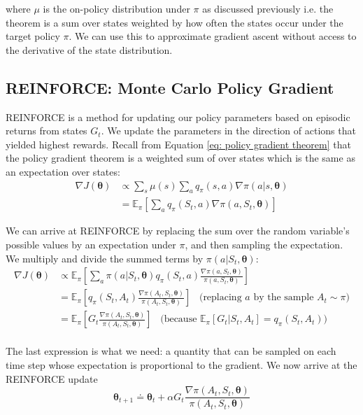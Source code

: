 where $\mu$ is the on-policy distribution under $\pi$ as discussed previously i.e. the theorem is a sum over states weighted by how often the states occur under the target policy $\pi$. We can use this to approximate gradient ascent without access to the derivative of the state distribution.

\subsection{REINFORCE: Monte Carlo Policy Gradient}
REINFORCE is a method for updating our policy parameters based on episodic returns from states $G_t$. We update the parameters in the direction of actions that yielded highest rewards. Recall from Equation \ref{eq: policy gradient theorem} that the policy gradient theorem is a weighted sum of over states which is the same as an expectation over states:
\begin{align}
\nabla J(\boldsymbol{\theta}) &\propto \sum_{s} \mu(s) \sum_{a} q_\pi(s,a) \nabla \pi(a|s, \boldsymbol{\theta}) \\
&= \mathbb{E}_\pi \left[\sum_{a} q_\pi(S_t, a) \nabla \pi(a, S_t, \boldsymbol{\theta})  \right]
\end{align}

We can arrive at REINFORCE by replacing the sum over the random variable's possible values by an expectation under $\pi$, and then sampling the expectation. We multiply and divide the summed terms by $\pi(a | S_t, \boldsymbol{\theta})$:
\begin{align}
\nabla J(\boldsymbol{\theta}) &\propto \mathbb{E}_\pi \left[\sum_{a} \pi(a | S_t, \boldsymbol{\theta}) q_\pi(S_t, a) \frac{\nabla \pi(a, S_t, \boldsymbol{\theta})}{\pi(a, S_t, \boldsymbol{\theta})} \right] \\
&= \mathbb{E}_\pi \left[q_\pi(S_t, A_t) \frac{\nabla \pi(A_t, S_t, \boldsymbol{\theta})}{\pi(A_t, S_t, \boldsymbol{\theta})} \right] \; \; \; \text{(replacing $a$ by the sample $A_t \sim \pi$)} \\
&= \mathbb{E}_\pi \left[G_t \frac{\nabla \pi(A_t, S_t, \boldsymbol{\theta})}{\pi(A_t, S_t, \boldsymbol{\theta})} \right] \; \; \; \text{(because $\mathbb{E}_\pi \left[G_t|S_t, A_t\right] = q_\pi(S_t, A_t)$)} \\
\end{align}

The last expression is what we need: a quantity that can be sampled on each time step whose expectation is proportional to the gradient. We now arrive at the REINFORCE update
\begin{equation}
\boldsymbol{\theta}_{t+1} \doteq \boldsymbol{\theta}_{t} + \alpha G_t \frac{\nabla \pi(A_t, S_t, \boldsymbol{\theta})}{\pi(A_t, S_t, \boldsymbol{\theta})}
\end{equation}

